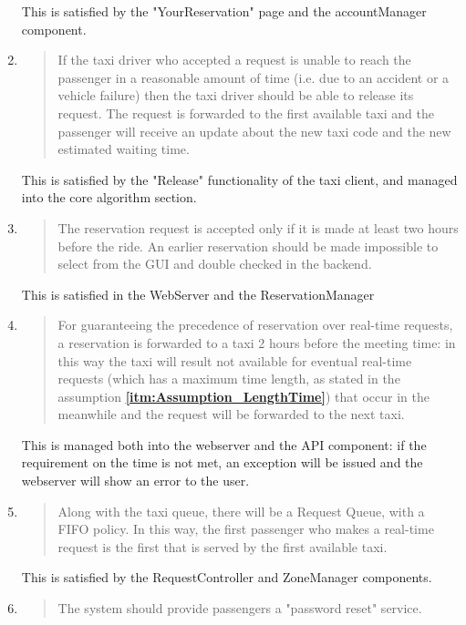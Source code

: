 \documentclass[11pt, a4paper,titlepage]{article}
\newcommand{\linkitm}[1]{\underline{\textbf{\ref{#1}}}}
\begin{document}
\begin{enumerate}
\begin{quotation}
		\end{quotation}
			This is satisfied by the "YourReservation" page and the accountManager component.
		\item
		\begin{quotation} 
			 If the taxi driver who accepted a request is unable to reach the passenger in a reasonable amount of time (i.e. due to an accident or a vehicle failure) then the taxi driver should be able to release its request. The request is forwarded to the first available taxi and the passenger will receive an update about the new taxi code and the new estimated waiting time.
		\end{quotation}
			This is satisfied by the "Release" functionality of the taxi client, and managed into the core algorithm section.
		\item
		\begin{quotation} 
			 The reservation request is accepted only if it is made at least two hours before the ride. An earlier reservation should be made impossible to select from the GUI and double checked in the backend.
			\end{quotation}
			This is satisfied in the WebServer and the ReservationManager 
			\item
			\begin{quotation} 
				For guaranteeing the precedence of reservation over real-time requests, a reservation is forwarded to a taxi 2 hours before the meeting time: in this way the taxi will result not available for eventual real-time requests (which has a maximum time length, as stated in the assumption \linkitm{itm:Assumption_LengthTime}) that occur in the meanwhile and the request will be forwarded to the next taxi.
		\end{quotation}
		This is managed both into the webserver and the API component: if the requirement on the time is not met, an exception will be issued and the webserver will show an error to the user.
		\item
		\begin{quotation} 
			 Along with the taxi queue, there will be a Request Queue, with a FIFO policy. In this way, the first passenger who makes a real-time request is the first that is served by the first available taxi. 
			\end{quotation}
			This is satisfied by the RequestController and ZoneManager components.
			\item
			\begin{quotation} 
				 The system should provide passengers a "password reset" service.

\end{quotation}
\end{enumerate}
\end{document}
